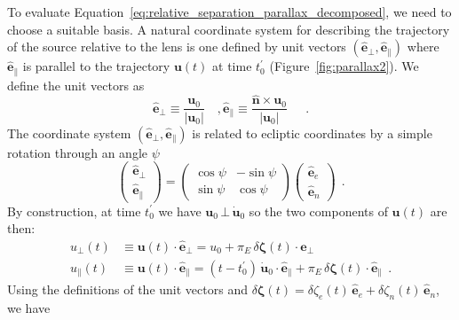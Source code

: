 \documentclass[12pt,dvipsnames]{report}
\newcommand{\hquad}{~~}
\begin{document}
To evaluate Equation~\ref{eq:relative_separation_parallax_decomposed}, we need
to choose a suitable basis. A natural coordinate system for describing the
trajectory of the source relative to the lens is one defined by unit vectors
$(\mathbf{\hat e}_\bot,\mathbf{\hat e}_\parallel)$ where $\mathbf{\hat e}_\parallel$ 
is parallel to the trajectory $\mathbf{u}(t)$ at time $t_0^\prime$
(Figure~\ref{fig:parallax2}). 
We define the unit vectors as
\begin{equation}
    \mathbf{\hat e}_\bot\equiv \frac{\mathbf{u}_0}{|\mathbf{u}_0|}\quad,
    \mathbf{\hat e}_\parallel\equiv \frac{\mathbf{\hat n}\times\mathbf{u}_0}{|\mathbf{u}_0|}\quad
    \hquad.
\end{equation}
The coordinate system $(\mathbf{\hat e}_\bot,\mathbf{\hat e}_\parallel)$ is related to 
ecliptic coordinates by a simple rotation through an angle $\psi$
\begin{equation}
    \begin{pmatrix}
        \mathbf{\hat e}_\bot \\
        \mathbf{\hat e}_\parallel
    \end{pmatrix}
    =
    \begin{pmatrix}
        \cos\psi & -\sin\psi \\
        \sin\psi & \cos\psi
    \end{pmatrix}
    \begin{pmatrix}
        \mathbf{\hat e}_e \\
        \mathbf{\hat e}_n
    \end{pmatrix}
    \label{eq:ecliptic_to_parallel}
    \hquad.
\end{equation}
By construction, at time $t_0^\prime$ we have
$\mathbf{u}_0\,\bot\,\dot{\mathbf{u}}_0$ so the two components of
$\mathbf{u}(t)$ are then:
\begin{align}
    u_\bot(t)      & \equiv \mathbf{u}(t)\cdot \mathbf{\hat e}_\bot= u_0 +
    \pi_E\,\delta\boldsymbol \zeta(t)\cdot\mathbf{\hat e}_\bot                                                                                                                                       \\
    u_\parallel(t) & \equiv \mathbf{u}(t)\cdot \mathbf{\hat e}_\parallel= (t-t_0^\prime)\,\dot{\mathbf{u}}_0\cdot\mathbf{\hat e}_\parallel+ \pi_E\,\delta\boldsymbol \zeta(t)\cdot\mathbf{\hat e}_\parallel
    \hquad.
\end{align}
Using the definitions of the unit vectors and
$\delta\boldsymbol \zeta(t)=
    \delta \zeta_e(t)\,\mathbf{\hat e}_e+\delta \zeta_n(t)\,\mathbf{\hat e}_n$, we have
\end{document}
